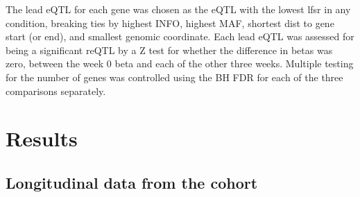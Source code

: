 The lead \gls{eQTL} for each gene was chosen as the \gls{eQTL} with the lowest \gls{lfsr} in any condition, 
breaking ties by highest INFO, highest \gls{MAF}, shortest dist to gene start (or end), and smallest genomic coordinate.
Each lead \gls{eQTL} was assessed for being a significant \gls{reQTL} by a Z test for whether the difference in betas was zero, between the week 0 beta and each of the other three weeks.
Multiple testing for the number of genes was controlled using the \gls{BH} \gls{FDR} for each of the three comparisons separately.



\section{Results}

\subsection{Longitudinal  data from the  cohort}

